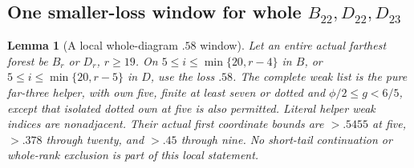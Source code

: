 \documentclass[11pt]{article}
\newtheorem{lemma}[theorem]{Lemma}
\theoremstyle{definition}
\theoremstyle{remark}
\begin{document}
\subsection{One smaller-loss window for whole $B_{22},D_{22},D_{23}$}
\label{app:tail:whole58}
\begin{lemma}[A local whole-diagram $.58$ window]
\label{app:tail:lem:whole58local}
Let an entire actual farthest forest be $B_r$ or $D_r$, $r\ge19$.
On $5\le i\le\min\{20,r-4\}$ in $B$, or
$5\le i\le\min\{20,r-5\}$ in $D$, use the loss $.58$.
The complete weak list is the pure far-three helper, with own five,
finite at least seven or dotted and $\phi/2\le g<6/5$, except
that isolated dotted own at five is also permitted.
Literal helper weak indices are nonadjacent. Their actual first
coordinate bounds are $>.5455$ at five, $>.378$ through twenty,
and $>.45$ through nine. No short-tail continuation or whole-rank
exclusion is part of this local statement.
\end{lemma}
\end{document}
